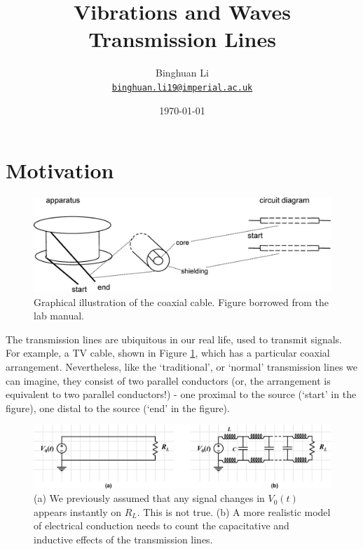 \documentclass[12pt,a4paper]{article}
\begin{document}
\title{\textbf{Vibrations and Waves} \\ Transmission Lines}
\author{Binghuan Li\\ \href{mailto:binghuan.li19@imperial.ac.uk}{\texttt{binghuan.li19@imperial.ac.uk}}}
\date{\today}
\maketitle
\section{Motivation}
\begin{figure}[H]
    \centering
    \includegraphics[width=.8\linewidth]{coaxial_cable.eps}
    \caption{Graphical illustration of the coaxial cable. Figure borrowed from the lab manual.}
    \label{fig:coaxial_cable}
\end{figure}
The transmission lines are ubiquitous in our real life, used to transmit signals. For example, a TV cable, shown in Figure \ref{fig:coaxial_cable}, which has a particular coaxial arrangement. Nevertheless, like the `traditional', or `normal' transmission lines we can imagine, they consist of two parallel conductors (or, the arrangement is equivalent to two parallel conductors!) - one proximal to the source (`start' in the figure), one distal to the source (`end' in the figure).

\begin{figure}[H]
    \centering
    \includegraphics[width=\linewidth]{transmission_line.eps}
    \caption{(a) We previously assumed that any signal changes in $V_0(t)$ appears instantly on $R_L$. This is not true. (b) A more realistic model of electrical conduction needs to count the capacitative and inductive effects of the transmission lines.}
    \label{fig:transmission_line}
\end{figure}
\end{document}
